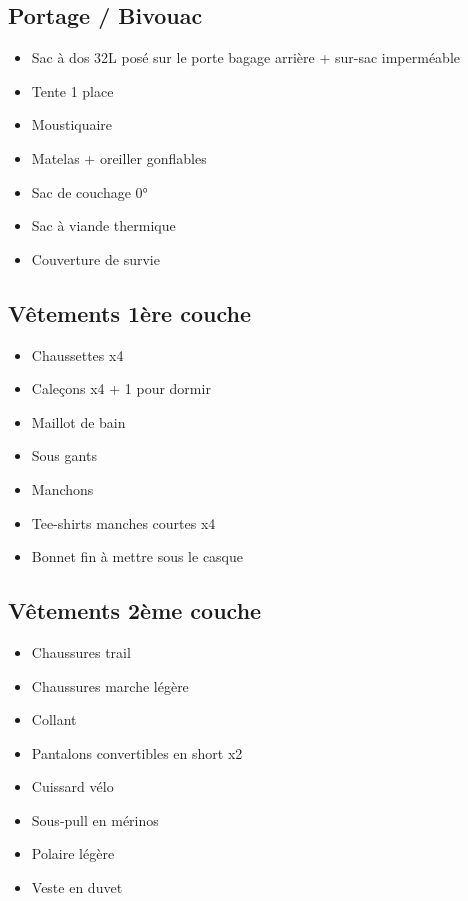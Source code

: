   \subsection*{ Portage / Bivouac}
 \begin{itemize}
 \item Sac à dos 32L posé sur le porte bagage arrière + sur-sac imperméable
 \item Tente 1 place
 \item Moustiquaire
 \item Matelas + oreiller gonflables
 \item Sac de couchage 0°
 \item Sac à viande thermique
 \item Couverture de survie
 \end{itemize}
 
  \subsection*{Vêtements 1ère couche}
 \begin{itemize}
 \item Chaussettes x4
 \item Caleçons x4 + 1 pour dormir
 \item Maillot de bain
 \item Sous gants
 \item Manchons
 \item Tee-shirts manches courtes x4
 \item Bonnet fin à mettre sous le casque
 \end{itemize}
 
  \subsection*{Vêtements 2ème couche}
 \begin{itemize}
 \item Chaussures trail
 \item Chaussures marche légère
 \item Collant
 \item Pantalons convertibles en short x2
 \item Cuissard vélo
 \item Sous-pull en mérinos
 \item Polaire légère
 \item Veste en duvet
 \end{itemize}

